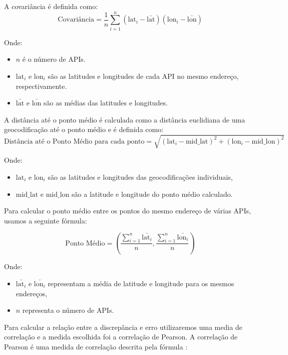 A covariância é definida como:
 \begin{equation}
    \text{Covariância} = \frac{1}{n}\sum_{i=1}^{n}(\text{lat}_i - \bar{\text{lat}})(\text{lon}_i - \bar{\text{lon}}) 
 \end{equation}

Onde:
 \begin{itemize}
     \item $n$ é o número de APIs.
     \item $\text{lat}_i$ e $\text{lon}_i$ são as latitudes e longitudes de cada API no mesmo endereço, respectivamente.
     \item $\bar{\text{lat}}$ e $\bar{\text{lon}}$ são as médias das latitudes e longitudes.
 \end{itemize}

A distância até o ponto médio é calculada como a distância euclidiana de uma geocodificação até o ponto médio e é definida como:
 \begin{equation}
     \text{Distância até o Ponto Médio para cada ponto} = \sqrt{(\text{lat}_i - \text{mid\_lat})^2 + (\text{lon}_i - \text{mid\_lon})^2}
 \end{equation}
 
Onde:
 \begin{itemize}
     \item $\text{lat}_i$ e $\text{lon}_i$ são as latitudes e longitudes das geocodificações individuais,
     \item $\text{mid\_lat}$ e $\text{mid\_lon}$ são a latitude e longitude do ponto médio calculado.
 \end{itemize}

Para calcular o ponto médio entre os pontos do mesmo endereço de várias APIs, usamos a seguinte fórmula:

\begin{equation}
     \text{Ponto Médio} = \left(\frac{{\sum_{i=1}^{n} \bar{\text{lat}_i}}}{n}, \frac{{\sum_{i=1}^{n} \bar{\text{lon}_i}}}{n}\right)
\end{equation}

Onde:
 \begin{itemize}
     \item $\bar{\text{lat}_i}$ e $\bar{\text{lon}_i}$ representam a média de latitude e longitude para os mesmos endereços,
     \item $n$ representa o número de APIs.
 \end{itemize}

Para calcular a relação entre a discrepância e erro utilizaremos uma media de correlação e a medida escolhida foi a correlação de Pearson. A correlação de Pearson é uma medida de correlação descrita pela fórmula \cite{callegari2007}:

